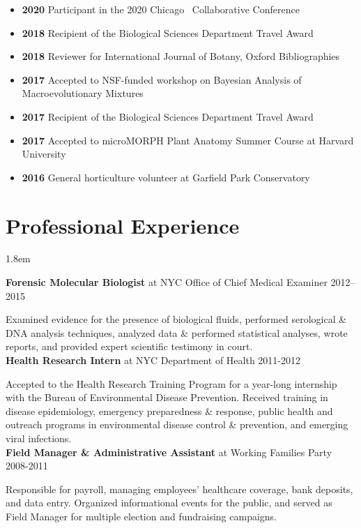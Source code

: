 \documentclass[]{article}
\begin{document}
\begin{itemize}[label=$\mathwitch*$]
\item{\textbf{2020} Participant in the 2020 Chicago \textcolor{light-gray}{\faRProject}\ Collaborative Conference \href{https://chircollab.github.io/}{\faLink}}
\item{\textbf{2018} Recipient of the Biological Sciences Department Travel Award}
\item{\textbf{2018} Reviewer for International Journal of Botany, Oxford Bibliographies}
\item{\textbf{2017} Accepted to NSF-funded workshop on Bayesian Analysis of Macroevolutionary Mixtures \href{http://bamm-project.org/index.html}{\faLink}}
\item{\textbf{2017} Recipient of the Biological Sciences Department Travel Award}
\item{\textbf{2017} Accepted to microMORPH Plant Anatomy Summer Course at Harvard University \href{https://web.archive.org/web/20170922060558/http://arboretum.harvard.edu/tracing-evolution-form-function/"}{\faLink}}
\item{\textbf{2016} General horticulture volunteer at Garfield Park Conservatory \href{https://garfieldconservatory.org/}{\faLink}}
\end{itemize}

\section{Professional Experience}

\vspace{4mm}
\leftskip 1.8em

\textbf{Forensic Molecular Biologist} at NYC Office of Chief Medical Examiner \hfill 2012--2015
     
Examined evidence for the presence of biological fluids, performed serological \& DNA analysis \linebreak techniques, analyzed data \& performed statistical analyses, wrote reports, and provided expert \linebreak scientific testimony in court.\\
   
\textbf{Health Research Intern} at NYC Department of Health \hfill 2011-2012
     
Accepted to the Health Research Training Program for a year-long internship with the Bureau of \linebreak Environmental Disease Prevention. Received training in disease epidemiology, emergency preparedness \& response, public health and outreach programs in environmental disease control \&  prevention, and emerging viral infections.\\
     
\textbf{Field Manager \& Administrative Assistant} at Working Families Party \hfill 2008-2011
     
Responsible for payroll, managing employees' healthcare coverage, bank deposits, and data entry. \linebreak Organized informational events for the public, and served as Field Manager for multiple election and fundraising campaigns.
\end{document}
